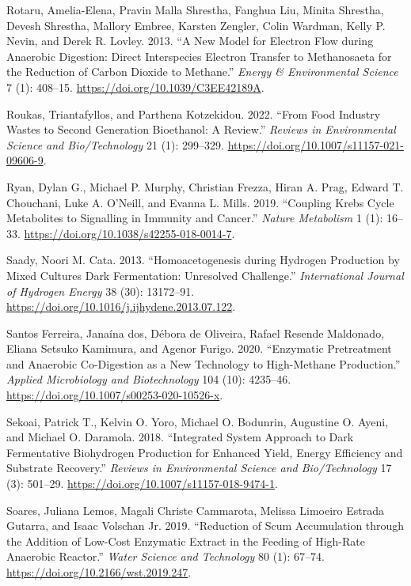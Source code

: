 \documentclass[11pt]{report}
\begin{document}
\begin{hangparas}{1.5em}{1}
\hypertarget{citeproc_bib_item_64}{Rotaru, Amelia-Elena, Pravin Malla Shrestha, Fanghua Liu, Minita Shrestha, Devesh Shrestha, Mallory Embree, Karsten Zengler, Colin Wardman, Kelly P. Nevin, and Derek R. Lovley. 2013. “A New Model for Electron Flow during Anaerobic Digestion: Direct Interspecies Electron Transfer to Methanosaeta for the Reduction of Carbon Dioxide to Methane.” \textit{Energy \& Environmental Science} 7 (1): 408–15. \url{https://doi.org/10.1039/C3EE42189A}.}

\hypertarget{citeproc_bib_item_65}{Roukas, Triantafyllos, and Parthena Kotzekidou. 2022. “From Food Industry Wastes to Second Generation Bioethanol: A Review.” \textit{Reviews in Environmental Science and Bio/Technology} 21 (1): 299–329. \url{https://doi.org/10.1007/s11157-021-09606-9}.}

\hypertarget{citeproc_bib_item_66}{Ryan, Dylan G., Michael P. Murphy, Christian Frezza, Hiran A. Prag, Edward T. Chouchani, Luke A. O’Neill, and Evanna L. Mills. 2019. “Coupling Krebs Cycle Metabolites to Signalling in Immunity and Cancer.” \textit{Nature Metabolism} 1 (1): 16–33. \url{https://doi.org/10.1038/s42255-018-0014-7}.}

\hypertarget{citeproc_bib_item_67}{Saady, Noori M. Cata. 2013. “Homoacetogenesis during Hydrogen Production by Mixed Cultures Dark Fermentation: Unresolved Challenge.” \textit{International Journal of Hydrogen Energy} 38 (30): 13172–91. \url{https://doi.org/10.1016/j.ijhydene.2013.07.122}.}

\hypertarget{citeproc_bib_item_68}{Santos Ferreira, Janaína dos, Débora de Oliveira, Rafael Resende Maldonado, Eliana Setsuko Kamimura, and Agenor Furigo. 2020. “Enzymatic Pretreatment and Anaerobic Co-Digestion as a New Technology to High-Methane Production.” \textit{Applied Microbiology and Biotechnology} 104 (10): 4235–46. \url{https://doi.org/10.1007/s00253-020-10526-x}.}

\hypertarget{citeproc_bib_item_69}{Sekoai, Patrick T., Kelvin O. Yoro, Michael O. Bodunrin, Augustine O. Ayeni, and Michael O. Daramola. 2018. “Integrated System Approach to Dark Fermentative Biohydrogen Production for Enhanced Yield, Energy Efficiency and Substrate Recovery.” \textit{Reviews in Environmental Science and Bio/Technology} 17 (3): 501–29. \url{https://doi.org/10.1007/s11157-018-9474-1}.}

\hypertarget{citeproc_bib_item_70}{Soares, Juliana Lemos, Magali Christe Cammarota, Melissa Limoeiro Estrada Gutarra, and Isaac Volschan Jr. 2019. “Reduction of Scum Accumulation through the Addition of Low-Cost Enzymatic Extract in the Feeding of High-Rate Anaerobic Reactor.” \textit{Water Science and Technology} 80 (1): 67–74. \url{https://doi.org/10.2166/wst.2019.247}.}


\end{hangparas}
\end{document}
